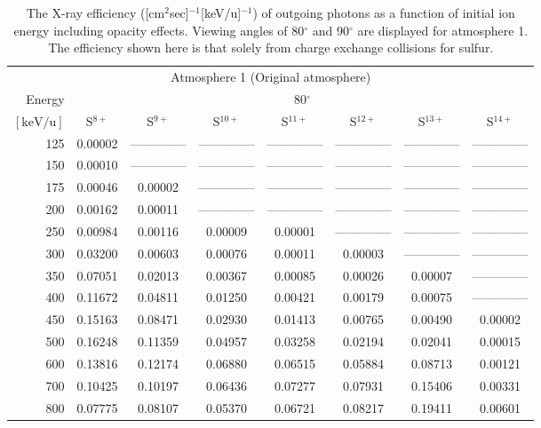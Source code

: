 \begin{table}[ht]
    \centering
    \caption{The X-ray efficiency ([cm$^2$sec]$^{-1}$[keV/u]$^{-1}$) of outgoing photons as a function of initial ion energy including opacity effects. Viewing angles of 80$^\circ$ and 90$^\circ$ are displayed for atmosphere 1. The efficiency shown here is that solely from charge exchange collisions for sulfur.}
    \begin{tabular}{r|c|c|c|c|c|c|c}
    \multicolumn{8}{c}{Atmosphere 1 (Original atmosphere)} \\ \cline{2-8}
    Energy & \multicolumn{7}{c}{80$^\circ$} \\ \cline{2-8}
    $\mathrm{[keV/u]}$ & S$^{8+}$ & S$^{9+}$ & S$^{10+}$ & S$^{11+}$ & S$^{12+}$ & S$^{13+}$ & S$^{14+}$ \\ \cline{1-8}
      125 & 0.00002 & -------------- & -------------- & -------------- & -------------- & -------------- & -------------- \\
      150 & 0.00010 & -------------- & -------------- & -------------- & -------------- & -------------- & -------------- \\
      175 & 0.00046 & 0.00002 & -------------- & -------------- & -------------- & -------------- & -------------- \\
      200 & 0.00162 & 0.00011 & -------------- & -------------- & -------------- & -------------- & -------------- \\
      250 & 0.00984 & 0.00116 & 0.00009 & 0.00001 & -------------- & -------------- & -------------- \\
      300 & 0.03200 & 0.00603 & 0.00076 & 0.00011 & 0.00003 & -------------- & -------------- \\
      350 & 0.07051 & 0.02013 & 0.00367 & 0.00085 & 0.00026 & 0.00007 & -------------- \\
      400 & 0.11672 & 0.04811 & 0.01250 & 0.00421 & 0.00179 & 0.00075 & -------------- \\
      450 & 0.15163 & 0.08471 & 0.02930 & 0.01413 & 0.00765 & 0.00490 & 0.00002 \\
      500 & 0.16248 & 0.11359 & 0.04957 & 0.03258 & 0.02194 & 0.02041 & 0.00015 \\
      600 & 0.13816 & 0.12174 & 0.06880 & 0.06515 & 0.05884 & 0.08713 & 0.00121 \\
      700 & 0.10425 & 0.10197 & 0.06436 & 0.07277 & 0.07931 & 0.15406 & 0.00331 \\
      800 & 0.07775 & 0.08107 & 0.05370 & 0.06721 & 0.08217 & 0.19411 & 0.00601 \\

\end{tabular}
\end{table}
